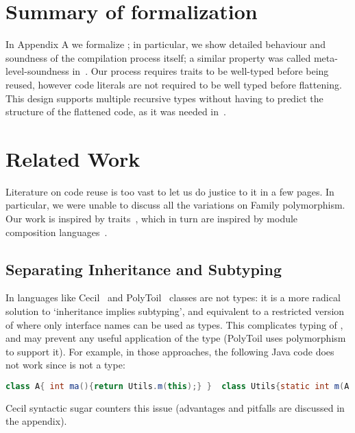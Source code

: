 \saveSpace
\section{Summary of formalization}
\saveSpace
In Appendix A we formalize \name; in particular, we 
show detailed behaviour and soundness
of the compilation process itself;
a similar property was called meta-level-soundness in~\cite{servetto2014meta}.
Our process requires traits to be well-typed before being reused,
however code literals are not required to be well typed before flattening.
This design supports multiple recursive types without having to
predict the structure of the flattened code, as it was
needed in~\cite{deep}.

\saveSpace
\section{Related Work}
\saveSpace
Literature on code reuse is too vast to let us do justice to it in a few pages.
In particular, we were unable to discuss all the variations on Family polymorphism.
Our work is inspired by traits~\cite{ducasse2006traits}, which in turn
are inspired by module composition languages~\cite{ancona2002calculus}.

\subsection{Separating Inheritance and Subtyping}
In languages like Cecil~\cite{chambers1995typechecking} and PolyToil~\cite{bruce1995polytoil}
classes are not types: it is a more radical solution to `inheritance implies subtyping', and equivalent to a restricted version of \name where only interface names can be used as types.
This complicates typing of \Q@this@,
and may prevent any useful application of the \Q@This@ type (PolyToil uses polymorphism to support it).
For example, in those approaches, the following Java code does not work since \Q@A@ is not a type:
\saveSpace\saveSpace\begin{lstlisting}[language=Java]
class A{ int ma(){return Utils.m(this);} }  class Utils{static int m(A a){..}}
\end{lstlisting}\saveSpace\saveSpace
Cecil syntactic sugar counters this issue (advantages and pitfalls are discussed in the appendix).

